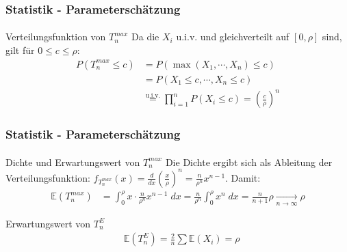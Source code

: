 \documentclass{beamer}
\begin{document}
\begin{frame}
    \frametitle{Statistik - Parameterschätzung}
\framesubtitle{}


\begin{block}{Verteilungsfunktion von $T_n^{max}$}
Da die $X_i$ u.i.v. und gleichverteilt auf $[0, \rho]$ sind, gilt für $0 \leq c \leq \rho$:
\begin{align*}
P( T_n^{max}  \leq c) & = P(\max(X_1, \cdots, X_n) \leq c) \\
& = P(X_1 \leq c, \cdots, X_n \leq c) \\
& \overset{\text{u.i.v.}}{=} \prod_{i=1}^n P(X_i \leq c) = \left(\frac{c}{\rho}\right)^n
\end{align*}
\end{block}

 \end{frame}


\begin{frame}
    \frametitle{Statistik - Parameterschätzung}
\framesubtitle{}

\begin{block}{Dichte und Erwartungswert von $T_n^{max}$}
Die Dichte ergibt sich als Ableitung der Verteilungsfunktion:
$f_{T_n^{max}}(x) = \frac{d}{dx} \left(\frac{x}{\rho}\right)^n = \frac{n}{\rho^n} x^{n-1}$. Damit:
\begin{align*}
\mathbb{E}(T_n^{max} ) & = \int_{0}^{\rho} x \cdot \frac{n}{\rho^n} x^{n- 1} \; dx  = \frac{n}{\rho^n} \int_{0}^{\rho} x^n \; dx = \frac{n}{n+1} \rho    \underset{n \to \infty}{\longrightarrow} \rho
\end{align*}
\end{block}

\begin{block}{Erwartungswert von $T_n^{E}$}
\begin{align*}
& \mathbb{E}(T_n^{E} ) = \frac{2}{n} \sum \mathbb{E}(X_i)   = \rho
\end{align*}
\end{block}
 \end{frame}
\end{document}
